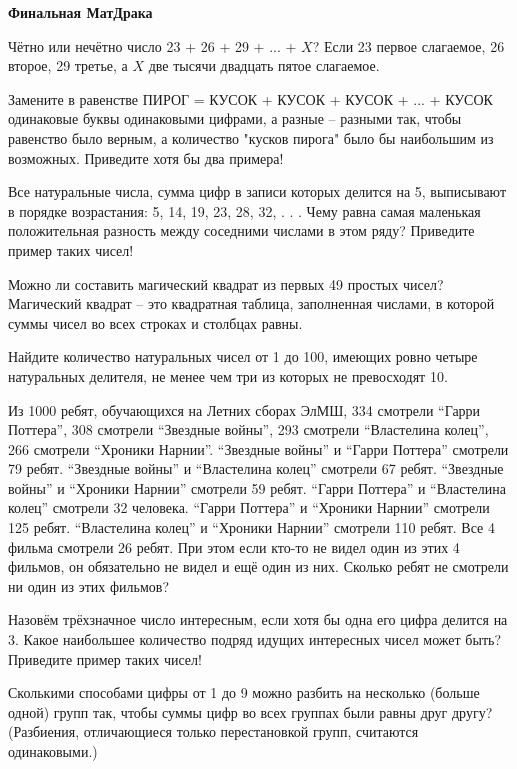 \centerline{\bf \Huge Финальная МатДрака }

 Чётно или нечётно число  23 + 26 + 29 + ... + $X$? Если 23 первое слагаемое, 26 второе, 29 третье, а $X$ две тысячи двадцать пятое слагаемое.


 Замените в равенстве   ПИРОГ = КУСОК + КУСОК + КУСОК + ... + КУСОК   одинаковые буквы одинаковыми цифрами, а разные – разными так, чтобы равенство было верным, а количество "кусков пирога" было бы наибольшим из возможных. Приведите хотя бы два примера!


 Все натуральные числа, сумма цифр в записи которых делится
на 5, выписывают в порядке возрастания: 5, 14, 19, 23, 28, 32, . . . Чему равна самая маленькая
положительная разность между соседними числами в этом ряду? Приведите пример таких чисел!


 Можно ли составить магический квадрат из первых 49 простых чисел?
Магический квадрат – это квадратная таблица, заполненная числами, в которой суммы чисел во всех строках и столбцах равны.


 Найдите количество натуральных чисел от 1 до 100,
имеющих ровно четыре натуральных делителя, не менее чем три из которых не превосходят 10.


 Из 1000 ребят, обучающихся на Летних сборах ЭлМШ, 334 смотрели “Гарри Поттера”, 308 смотрели “Звездные
войны”, 293 смотрели “Властелина колец”, 266 смотрели “Хроники Нарнии”. “Звездные войны” и “Гарри Поттера” смотрели 79
ребят. “Звездные войны” и “Властелина колец” смотрели 67 ребят. “Звездные войны” и “Хроники Нарнии” смотрели 59 ребят.
“Гарри Поттера” и “Властелина колец” смотрели 32 человека. “Гарри Поттера” и “Хроники Нарнии” смотрели 125 ребят.
“Властелина колец” и “Хроники Нарнии” смотрели 110 ребят. Все 4 фильма смотрели 26 ребят. При этом если кто-то не видел
один из этих 4 фильмов, он обязательно не видел и ещё один из них. Сколько ребят не смотрели ни один из этих фильмов?


 Назовём трёхзначное число интересным, если хотя бы одна его
цифра делится на 3. Какое наибольшее количество подряд идущих интересных чисел может
быть? Приведите пример таких чисел!



  Сколькими способами цифры от 1 до 9 можно разбить на
несколько (больше одной) групп так, чтобы суммы цифр во всех группах были равны друг
другу? (Разбиения, отличающиеся только перестановкой групп, считаются одинаковыми.)

